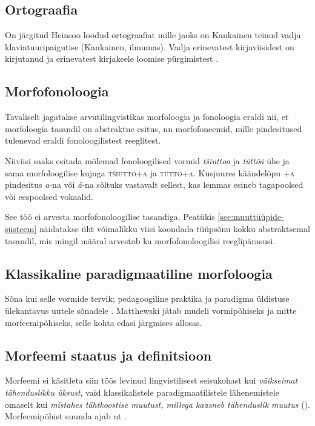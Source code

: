 \documentclass[12pt,a4paper]{article}
\begin{document}
\subsection{Ortograafia}
\label{sec:ortograafia}

On järgitud Heinsoo loodud ortograafiat mille jaoks on Kankainen teinud vadja klaviatuuripaigutise (Kankainen, ilmumas). Vadja erinevatest kirjaviisidest on kirjutanud \cite{ernits_vadja_2010} ja erinevatest kirjakeele loomise pürgimistest \cite{ernits_vadja_2006}.


\subsection{Morfofonoloogia}
Tavaliselt jagatakse arvutilingvistikas morfoloogia ja fonoloogia eraldi nii, et morfoloogia tasandil on abstraktne esitus, nn morfofoneemid, mille pindesitused tulenevad eraldi fonoloogilistest reeglitest.

Niiviisi saaks esitada mõlemad fonoloogilised vormid \textit{tšiuttoa} ja \textit{tüttöä} ühe ja sama morfoloogilise kujuga \textsc{tšiutto+a} ja \textsc{tüttö+a}. Kusjuures käändelõpu \textsc{+a} pindesitus \textit{a}-na või \textit{ä}-na sõltuks vastavalt sellest, kas lemmas esineb tagapoolsed või eespoolsed vokaalid.

See töö ei arvesta morfofonoloogilise tasandiga. Peatükis \ref{sec:muuttüüpide-süsteem} näidatakse üht võimalikku viisi koondada tüüpsõnu kokku abstraktsemal tasandil, mis mingil määral arvestab ka morfofonoloogilisi reeglipärasusi.


\subsection{Klassikaline paradigmaatiline morfoloogia}
Sõna kui selle vormide tervik; pedagoogiline praktika ja paradigma üldistuse ülekantavus uutele sõnadele \cite{matthews_morphology_1991}. Matthewski jätab mudeli vormipõhiseks ja mitte morfeemipõhiseks, selle kohta edasi järgmises allosas.


\subsection{Morfeemi staatus ja definitsioon}
Morfeemi ei käsitleta siin töös levinud lingvistilisest seisukohast kui \textit{väikseimat tähenduslikku üksust}, vaid klassikalistele paradigmaatilistele lähenemistele omaselt kui \textit{mistahes tähtkoostise muutust, millega kaasneb tähenduslik muutus} (\cites{beard_morpheme_1987}{beard_lexeme-morpheme_1995}). Morfeemipõhist suunda ajab nt \cite{stump_inflectional_2001}.
\end{document}
